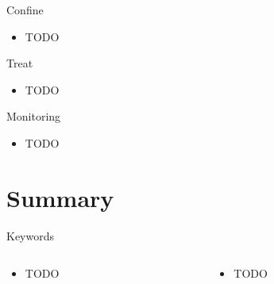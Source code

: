 \documentclass{curs}
\begin{document}
\begin{frame}{Confine}
  \begin{itemize}
    \item TODO
  \end{itemize}
\end{frame}

\begin{frame}{Treat}
  \begin{itemize}
    \item TODO
  \end{itemize}
\end{frame}

\begin{frame}{Monitoring}
  \begin{itemize}
    \item TODO
  \end{itemize}
\end{frame}


\section{Summary}

\begin{frame}{Keywords}
  \begin{columns}
    \begin{column}{0.5\textwidth}
      \begin{itemize}
        \item TODO
      \end{itemize}
    \end{column}
    \begin{column}{0.5\textwidth}
      \begin{itemize}
        \item TODO
      \end{itemize}
    \end{column}
  \end{columns}
\end{frame}
\end{document}
